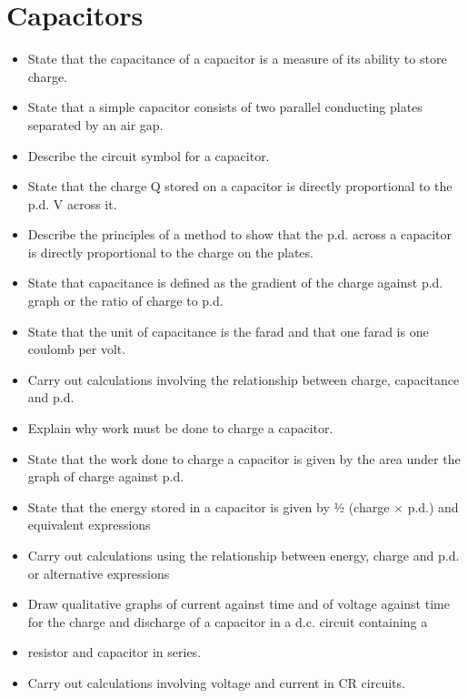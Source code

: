 \section{Capacitors}
\begin{multicols}{2}
	\begin{itemize}
        \item State that the capacitance of a capacitor is a measure of its ability to
            store charge.
        \item State that a simple capacitor consists of two parallel conducting
            plates separated by an air gap.
        \item Describe the circuit symbol for a capacitor.
        \item State that the charge Q stored on a capacitor is directly proportional
            to the p.d. V across it.
        \item Describe the principles of a method to show that the p.d. across a
            capacitor is directly proportional to the charge on the plates.
        \item State that capacitance is defined as the gradient of the charge against
            p.d. graph or the ratio of charge to p.d.
        \item State that the unit of capacitance is the farad and that one farad is one
            coulomb per volt.
        \item Carry out calculations involving the relationship between charge,
            capacitance and p.d.
        \item Explain why work must be done to charge a capacitor.
        \item State that the work done to charge a capacitor is given by the area
            under the graph of charge against p.d.
        \item State that the energy stored in a capacitor is given by 1⁄2 (charge ×
            p.d.) and equivalent expressions
        \item Carry out calculations using the relationship between energy, charge
            and p.d. or alternative expressions
        \item Draw qualitative graphs of current against time and of voltage against
            time for the charge and discharge of a capacitor in a d.c. circuit
            containing a
        \item resistor and capacitor in series.
        \item Carry out calculations involving voltage and current in CR circuits.
	\end{itemize}
\end{multicols}

